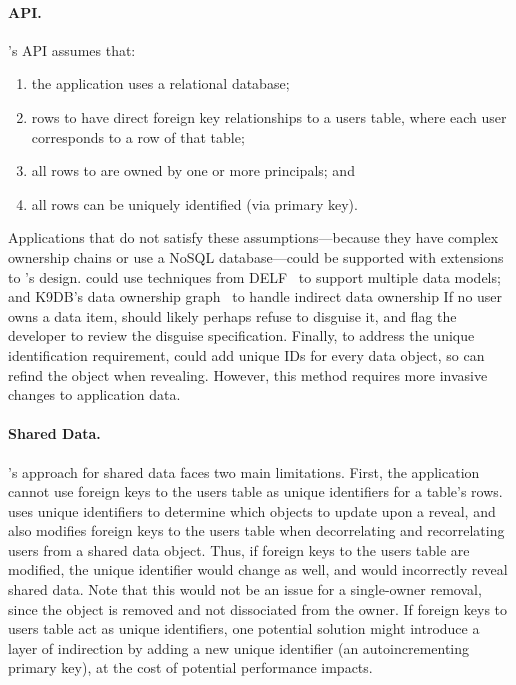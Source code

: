 \paragraph{API.}
\sys's API assumes that:
\begin{enumerate}[nosep]
    \item the application uses a relational database;
    \item rows to \xx have direct foreign key relationships to a users table,
    where each user corresponds to a row of that table;
    \item all rows to \xx are owned by one or more principals; and
    \item all rows can be uniquely identified (\eg via primary key).
\end{enumerate}
%
Applications that do not satisfy these assumptions---\eg because they have
complex ownership chains or use a NoSQL database---could be supported with
extensions to \sys's design. \sys could use techniques from DELF~\cite{delf} to
support multiple data models; 
%
and K9DB's data ownership graph~\cite{k9db} to handle indirect data ownership
If no user owns a data item, \sys should likely perhaps refuse to disguise it, and flag
the developer to review the disguise specification.  
%
Finally, to address the unique identification requirement, \sys could add unique
IDs for every data object, so \sys can refind the object when revealing.
However, this method requires more invasive changes to application data. 
%

\paragraph{Shared Data.}
\sys's approach for shared data faces two main limitations. First, the
application cannot use foreign keys to the users table as unique identifiers for
a table's rows. \sys uses unique identifiers to determine which objects to
update upon a reveal, and also modifies foreign keys to the users table when
decorrelating and recorrelating users from a shared data object. Thus, if
foreign keys to the users table are modified, the unique identifier would change
as well, and \sys would incorrectly reveal shared data.
%
Note that this would not be an issue for a single-owner removal, since the
object is removed and not dissociated from the owner.
%
If foreign keys to users table act as unique identifiers, one potential solution
might introduce a layer of indirection by adding a new unique identifier (\eg an
autoincrementing primary key), at the cost of potential performance impacts.

